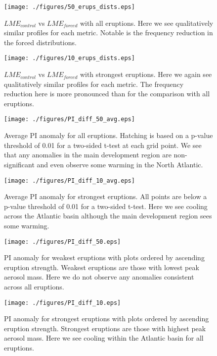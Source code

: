 \documentclass[phd,tocprelim]{cornell}
\begin{document}
\begin{figure}[!tbp]
\centering
\texttt{[image: ./figures/50\_erups\_dists.eps]}
\caption{$LME_{control}$ vs $LME_{forced}$ with all eruptions. Here we see qualitatively similar profiles for each metric. Notable is the frequency reduction in the forced distributions. }
\label{50:erups}
\end{figure}

\begin{figure}[!tbp]
\centering
\texttt{[image: ./figures/10\_erups\_dists.eps]}
\caption{$LME_{control}$ vs $LME_{forced}$ with strongest eruptions. Here we again see qualitatively similar profiles for each metric. The frequency reduction here is more pronounced than for the comparison with all eruptions. }
\label{10:erups}
\end{figure}

\begin{figure}[!tbp]
\centering
\texttt{[image: ./figures/PI\_diff\_50\_avg.eps]}
\caption{Average PI anomaly for all eruptions. Hatching is based on a p-value threshold of 0.01 for a two-sided t-test at each grid point. We see that any anomalies in the main development region are non-significant and even observe some warming in the North Atlantic.}
\label{pi:all:avg}
\end{figure}

\begin{figure}[!tbp]
\centering
\texttt{[image: ./figures/PI\_diff\_10\_avg.eps]}
\caption{Average PI anomaly for strongest eruptions. All points are below a p-value threshold of 0.01 for a two-sided t-test. Here we see cooling across the Atlantic basin although the main development region sees some warming.}
\label{pi:10:avg}
\end{figure}

\begin{figure}[!tbp]
\centering
\texttt{[image: ./figures/PI\_diff\_50.eps]}
\caption{PI anomaly for weakest eruptions with plots ordered by ascending eruption strength. Weakest eruptions are those with lowest peak aerosol mass. Here we do not observe any anomalies consistent across all eruptions.}
\label{pi:10:wk}
\end{figure}

\begin{figure}[!tbp]
\centering
\texttt{[image: ./figures/PI\_diff\_10.eps]}
\caption{PI anomaly for strongest eruptions with plots ordered by ascending eruption strength. Strongest eruptions are those with highest peak aerosol mass. Here we see cooling within the Atlantic basin for all eruptions.}
\label{pi:10:str}
\end{figure}
\end{document}
